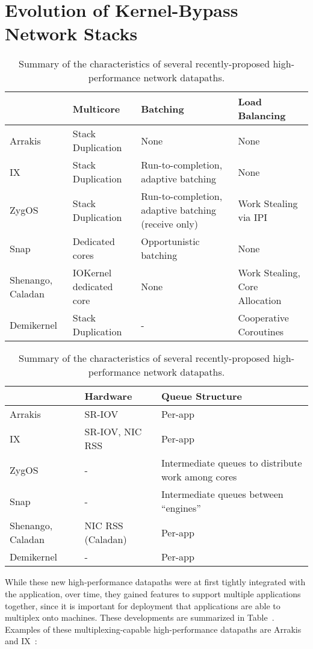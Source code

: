\section{Evolution of Kernel-Bypass Network Stacks}
\begin{table}
    \small
    \begin{tabular}{p{2cm} p{3cm} p{3.5cm} p{3cm}}
        \hline
                         & Multicore & Batching & Load Balancing \\
        \hline
        Arrakis          & Stack Duplication & None & None \\
        IX               & Stack Duplication & Run-to-completion, adaptive batching & None \\
        ZygOS            & Stack Duplication & Run-to-completion, adaptive batching (receive only) & Work Stealing via IPI \\
        Snap             & Dedicated cores & Opportunistic batching & None \\
        Shenango, Caladan& IOKernel dedicated core & None & Work Stealing, Core Allocation \\
        Demikernel       & Stack Duplication & - & Cooperative Coroutines \\
        \hline
    \end{tabular}
    \begin{tabular}{p{2cm} p{3cm} p{6.5cm}}
        \hline
                         & Hardware & Queue Structure \\
        \hline
        Arrakis          & SR-IOV & Per-app \\
        IX               & SR-IOV, NIC RSS & Per-app \\
        ZygOS            & - & Intermediate queues to distribute work among cores \\
        Snap             & - & Intermediate queues between ``engines'' \\
        Shenango, Caladan& NIC RSS (Caladan) & Per-app \\
        Demikernel       & - & Per-app \\
        \hline
    \end{tabular}
    \caption{Summary of the characteristics of several recently-proposed high-performance network datapaths. }
    \label{t:systems}
\end{table}
While these new high-performance datapaths were at first tightly integrated with the application, over time, they gained features to support multiple applications together, since it is important for deployment that applications are able to multiplex onto machines. These developments are summarized in Table~\cite{t:systems}. Examples of these multiplexing-capable high-performance datapaths are Arrakis~\cite{arrakis} and IX~\cite{ix}:

